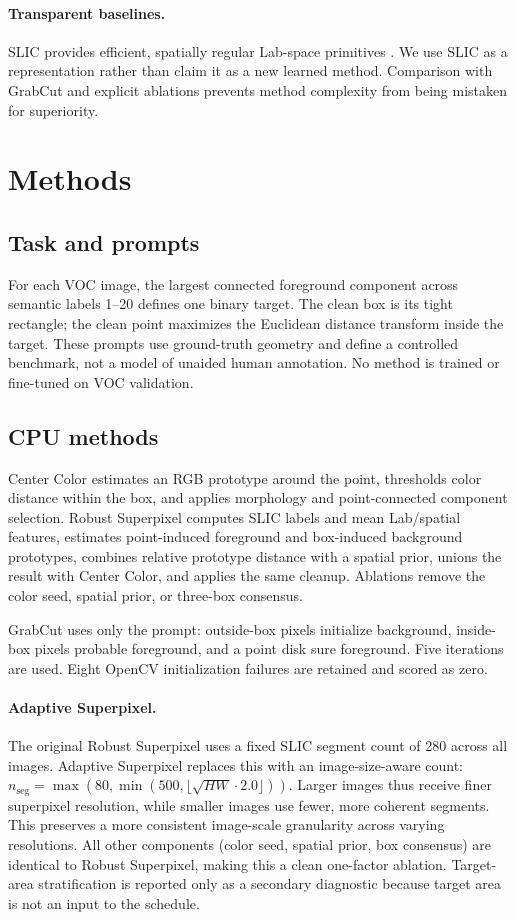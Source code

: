 \paragraph{Transparent baselines.}
SLIC provides efficient, spatially regular Lab-space primitives \cite{slic}. We use SLIC as a representation rather than claim it as a new learned method. Comparison with GrabCut and explicit ablations prevents method complexity from being mistaken for superiority.

\section{Methods}

\subsection{Task and prompts}
For each VOC image, the largest connected foreground component across semantic labels 1--20 defines one binary target. The clean box is its tight rectangle; the clean point maximizes the Euclidean distance transform inside the target. These prompts use ground-truth geometry and define a controlled benchmark, not a model of unaided human annotation. No method is trained or fine-tuned on VOC validation.

\subsection{CPU methods}
Center Color estimates an RGB prototype around the point, thresholds color distance within the box, and applies morphology and point-connected component selection. Robust Superpixel computes SLIC labels and mean Lab/spatial features, estimates point-induced foreground and box-induced background prototypes, combines relative prototype distance with a spatial prior, unions the result with Center Color, and applies the same cleanup. Ablations remove the color seed, spatial prior, or three-box consensus.

GrabCut uses only the prompt: outside-box pixels initialize background, inside-box pixels probable foreground, and a point disk sure foreground. Five iterations are used. Eight OpenCV initialization failures are retained and scored as zero.

\paragraph{Adaptive Superpixel.}
The original Robust Superpixel uses a fixed SLIC segment count of 280 across all images. Adaptive Superpixel replaces this with an image-size-aware count: $n_{\text{seg}} = \max(80, \min(500, \lfloor\sqrt{HW} \cdot 2.0\rfloor))$. Larger images thus receive finer superpixel resolution, while smaller images use fewer, more coherent segments. This preserves a more consistent image-scale granularity across varying resolutions. All other components (color seed, spatial prior, box consensus) are identical to Robust Superpixel, making this a clean one-factor ablation. Target-area stratification is reported only as a secondary diagnostic because target area is not an input to the schedule.

